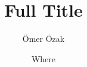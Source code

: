 \documentclass[pdftex,12pt,xcolor=pdftex,table]{beamer}
\title[Short Title]{Full Title}
\author[Ömer Özak (SMU)]{\Large Ömer Özak}
\institute[]{\Large SMU}
\date[Where]{\small Where}
\theoremstyle{definition}
\theoremstyle{remark}
\numberwithin{equation}{section}
\numberwithin{figure}{section}
\begin{document}
\begin{frame}%
\titlepage
\end{frame}


%
\end{document}
